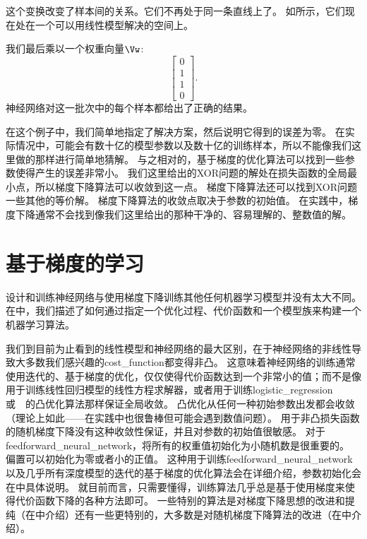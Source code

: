 
这个变换改变了样本间的关系。它们不再处于同一条直线上了。
如所示，它们现在处在一个可以用线性模型解决的空间上。

我们最后乘以一个权重向量$\Vw$:
\begin{equation}
\begin{bmatrix}
0\\
1\\
1\\
0
\end{bmatrix}.
\end{equation}
神经网络对这一批次中的每个样本都给出了正确的结果。

在这个例子中，我们简单地指定了解决方案，然后说明它得到的误差为零。
在实际情况中，可能会有数十亿的模型参数以及数十亿的训练样本，所以不能像我们这里做的那样进行简单地猜解。
与之相对的，基于梯度的优化算法可以找到一些参数使得产生的误差非常小。
我们这里给出的XOR问题的解处在损失函数的全局最小点，所以梯度下降算法可以收敛到这一点。
梯度下降算法还可以找到XOR问题一些其他的等价解。
梯度下降算法的收敛点取决于参数的初始值。
在实践中，梯度下降通常不会找到像我们这里给出的那种干净的、容易理解的、整数值的解。

\section{基于梯度的学习}
\label{sec:gradient_based_learning}

设计和训练神经网络与使用梯度下降训练其他任何机器学习模型并没有太大不同。
在中，我们描述了如何通过指定一个优化过程、代价函数和一个模型族来构建一个机器学习算法。

我们到目前为止看到的线性模型和神经网络的最大区别，在于神经网络的非线性导致大多数我们感兴趣的\gls{cost_function}都变得非凸。
这意味着神经网络的训练通常使用迭代的、基于梯度的优化，仅仅使得代价函数达到一个非常小的值；而不是像用于训练线性回归模型的线性方程求解器，或者用于训练\gls{logistic_regression}或~~的凸优化算法那样保证全局收敛。
凸优化从任何一种初始参数出发都会收敛（理论上如此——在实践中也很鲁棒但可能会遇到数值问题）。
用于非凸损失函数的随机梯度下降没有这种收敛性保证，并且对参数的初始值很敏感。
对于\gls{feedforward_neural_network}，将所有的权重值初始化为小随机数是很重要的。
偏置可以初始化为零或者小的正值。
这种用于训练\gls{feedforward_neural_network}以及几乎所有深度模型的迭代的基于梯度的优化算法会在详细介绍，参数初始化会在中具体说明。
就目前而言，只需要懂得，训练算法几乎总是基于使用梯度来使得代价函数下降的各种方法即可。
一些特别的算法是对梯度下降思想的改进和提纯（在中介绍）还有一些更特别的，大多数是对随机梯度下降算法的改进（在中介绍）。

